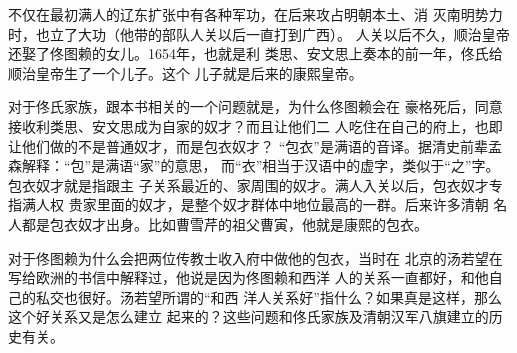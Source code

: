 不仅在最初满人的辽东扩张中有各种军功，在后来攻占明朝本土、消%
灭南明势力时，也立了大功（他带的部队人关以后一直打到广西）。%
人关以后不久，顺治皇帝还娶了佟图赖的女儿。1654年，也就是利%
类思、安文思上奏本的前一年，佟氏给顺治皇帝生了一个儿子。这个%
儿子就是后来的康熙皇帝。%
\par
对于佟氏家族，跟本书相关的一个问题就是，为什么佟图赖会在%
豪格死后，同意接收利类思、安文思成为自家的奴才？而且让他们二%
人吃住在自己的府上，也即让他们做的不是普通奴才，而是包衣奴才？%
“包衣”是满语的音译。据清史前辈孟森解释：“包”是满语“家”的意思，%
而“衣”相当于汉语中的虚字，类似于“之”字。包衣奴才就是指跟主%
子关系最近的、家周围的奴才。满人入关以后，包衣奴才专指满人权%
贵家里面的奴才，是整个奴才群体中地位最高的一群。后来许多清朝%
名人都是包衣奴才出身。比如曹雪芹的祖父曹寅，他就是康熙的包衣。%
\par
对于佟图赖为什么会把两位传教士收入府中做他的包衣，当时在%
北京的汤若望在写给欧洲的书信中解释过，他说是因为佟图赖和西洋%
人的关系一直都好，和他自己的私交也很好。汤若望所谓的“和西%
洋人关系好”指什么？如果真是这样，那么这个好关系又是怎么建立%
起来的？这些问题和佟氏家族及清朝汉军八旗建立的历史有关。%
